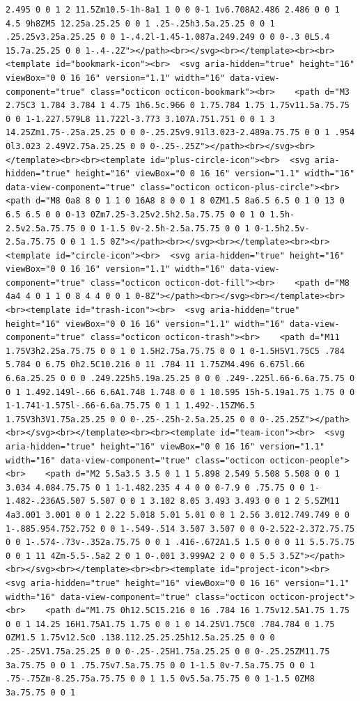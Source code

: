 \documentclass[
  letterpaper,
]{book}
\begin{document}
\begin{verbatim}
2.495 0 0 1 2 11.5Zm10.5-1h-8a1 1 0 0 0-1 1v6.708A2.486 2.486 0 0 1 4.5 9h8ZM5 12.25a.25.25 0 0 1 .25-.25h3.5a.25.25 0 0 1 .25.25v3.25a.25.25 0 0 1-.4.2l-1.45-1.087a.249.249 0 0 0-.3 0L5.4 15.7a.25.25 0 0 1-.4-.2Z"></path><br></svg><br></template><br><br><template id="bookmark-icon"><br>  <svg aria-hidden="true" height="16" viewBox="0 0 16 16" version="1.1" width="16" data-view-component="true" class="octicon octicon-bookmark"><br>    <path d="M3 2.75C3 1.784 3.784 1 4.75 1h6.5c.966 0 1.75.784 1.75 1.75v11.5a.75.75 0 0 1-1.227.579L8 11.722l-3.773 3.107A.751.751 0 0 1 3 14.25Zm1.75-.25a.25.25 0 0 0-.25.25v9.91l3.023-2.489a.75.75 0 0 1 .954 0l3.023 2.49V2.75a.25.25 0 0 0-.25-.25Z"></path><br></svg><br></template><br><br><template id="plus-circle-icon"><br>  <svg aria-hidden="true" height="16" viewBox="0 0 16 16" version="1.1" width="16" data-view-component="true" class="octicon octicon-plus-circle"><br>    <path d="M8 0a8 8 0 1 1 0 16A8 8 0 0 1 8 0ZM1.5 8a6.5 6.5 0 1 0 13 0 6.5 6.5 0 0 0-13 0Zm7.25-3.25v2.5h2.5a.75.75 0 0 1 0 1.5h-2.5v2.5a.75.75 0 0 1-1.5 0v-2.5h-2.5a.75.75 0 0 1 0-1.5h2.5v-2.5a.75.75 0 0 1 1.5 0Z"></path><br></svg><br></template><br><br><template id="circle-icon"><br>  <svg aria-hidden="true" height="16" viewBox="0 0 16 16" version="1.1" width="16" data-view-component="true" class="octicon octicon-dot-fill"><br>    <path d="M8 4a4 4 0 1 1 0 8 4 4 0 0 1 0-8Z"></path><br></svg><br></template><br><br><template id="trash-icon"><br>  <svg aria-hidden="true" height="16" viewBox="0 0 16 16" version="1.1" width="16" data-view-component="true" class="octicon octicon-trash"><br>    <path d="M11 1.75V3h2.25a.75.75 0 0 1 0 1.5H2.75a.75.75 0 0 1 0-1.5H5V1.75C5 .784 5.784 0 6.75 0h2.5C10.216 0 11 .784 11 1.75ZM4.496 6.675l.66 6.6a.25.25 0 0 0 .249.225h5.19a.25.25 0 0 0 .249-.225l.66-6.6a.75.75 0 0 1 1.492.149l-.66 6.6A1.748 1.748 0 0 1 10.595 15h-5.19a1.75 1.75 0 0 1-1.741-1.575l-.66-6.6a.75.75 0 1 1 1.492-.15ZM6.5 1.75V3h3V1.75a.25.25 0 0 0-.25-.25h-2.5a.25.25 0 0 0-.25.25Z"></path><br></svg><br></template><br><br><template id="team-icon"><br>  <svg aria-hidden="true" height="16" viewBox="0 0 16 16" version="1.1" width="16" data-view-component="true" class="octicon octicon-people"><br>    <path d="M2 5.5a3.5 3.5 0 1 1 5.898 2.549 5.508 5.508 0 0 1 3.034 4.084.75.75 0 1 1-1.482.235 4 4 0 0 0-7.9 0 .75.75 0 0 1-1.482-.236A5.507 5.507 0 0 1 3.102 8.05 3.493 3.493 0 0 1 2 5.5ZM11 4a3.001 3.001 0 0 1 2.22 5.018 5.01 5.01 0 0 1 2.56 3.012.749.749 0 0 1-.885.954.752.752 0 0 1-.549-.514 3.507 3.507 0 0 0-2.522-2.372.75.75 0 0 1-.574-.73v-.352a.75.75 0 0 1 .416-.672A1.5 1.5 0 0 0 11 5.5.75.75 0 0 1 11 4Zm-5.5-.5a2 2 0 1 0-.001 3.999A2 2 0 0 0 5.5 3.5Z"></path><br></svg><br></template><br><br><template id="project-icon"><br>  <svg aria-hidden="true" height="16" viewBox="0 0 16 16" version="1.1" width="16" data-view-component="true" class="octicon octicon-project"><br>    <path d="M1.75 0h12.5C15.216 0 16 .784 16 1.75v12.5A1.75 1.75 0 0 1 14.25 16H1.75A1.75 1.75 0 0 1 0 14.25V1.75C0 .784.784 0 1.75 0ZM1.5 1.75v12.5c0 .138.112.25.25.25h12.5a.25.25 0 0 0 .25-.25V1.75a.25.25 0 0 0-.25-.25H1.75a.25.25 0 0 0-.25.25ZM11.75 3a.75.75 0 0 1 .75.75v7.5a.75.75 0 0 1-1.5 0v-7.5a.75.75 0 0 1 .75-.75Zm-8.25.75a.75.75 0 0 1 1.5 0v5.5a.75.75 0 0 1-1.5 0ZM8 3a.75.75 0 0 1 
\end{verbatim}
\end{document}

